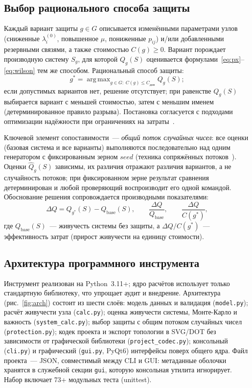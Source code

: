 \documentclass[12pt]{article}
\DeclareMathOperator*{\argmax}{arg\,max}
\begin{document}
\subsection{Выбор рационального способа защиты}

Каждый вариант защиты $g \in G$ описывается изменёнными параметрами узлов
(сниженные $\lambda_i^{(0)}$, повышенное $\mu$, пониженные $p_{ij}$)
и/или добавленными резервными связями, а также стоимостью $C(g) \geq 0$.
Вариант порождает производную систему $S_g$, для которой $Q_g(S)$
оценивается формулами~\eqref{eq:px}--\eqref{eq:wilson} тем же способом.
Рациональный способ защиты:
\begin{equation}
g^{*} = \argmax_{g \in G:\; C(g) \leq C_{\text{доп}}} Q_g(S);
\label{eq:argmax}
\end{equation}
если допустимых вариантов нет, решение отсутствует; при равенстве
$Q_g(S)$ выбирается вариант с меньшей стоимостью, затем с меньшим именем
(детерминированное правило разрыва). Постановка согласуется с подходами
оптимизации надёжности при ограничениях на
затраты~\cite{rausand,barlow}.

Ключевой элемент сопоставимости~--- \emph{общий поток случайных чисел}:
все оценки (базовая система и все варианты) выполняются последовательно
над одним генератором с фиксированным зерном $seed$ (техника сопряжённых
потоков~\cite{glasserman,ross}). Оценки $\hat Q_g(S)$ зависимы, их
различия отражают различия вариантов, а не случайность потоков; при
фиксированном зерне результат сравнения детерминирован и любой проверяющий
воспроизводит его одной командой. Обоснование решения сопровождается
производными показателями:
\begin{equation}
\Delta Q = Q_{g^{*}}(S) - Q_{\text{base}}(S), \qquad
\frac{\Delta Q}{Q_{\text{base}}}, \qquad
\frac{\Delta Q}{C(g^{*})},
\label{eq:deltaq}
\end{equation}
где $Q_{\text{base}}(S)$~--- живучесть системы без защиты, а
$\Delta Q / C(g^{*})$~--- эффективность затрат (прирост живучести на
единицу стоимости).

\subsection{Архитектура программного инструмента}

Инструмент реализован на Python~3.11+; ядро расчётов использует только
стандартную библиотеку, что упрощает аудит и внедрение. Архитектура
(рис.~\ref{fig:arch}) состоит из шести слоёв: модель данных и валидация
(\texttt{model.py}); расчёт живучести узла (\texttt{calc.py}); оценка
живучести системы, Монте-Карло и важность (\texttt{system\_calc.py});
выбор защиты с общим потоком случайных чисел (\texttt{protection.py});
кодек проекта и экспорт топологии в SVG/DOT без зависимости от
графической библиотеки (\texttt{project\_codec.py}); консольный
(\texttt{cli.py}) и графический (\texttt{gui.py}, PyQt6) интерфейсы поверх
общего ядра. Файл проекта~--- JSON, совместимый между CLI и GUI: метаданные
оболочки хранятся в служебной секции \texttt{gui}, которую консольная
утилита игнорирует. Набор включает 73+ модульных теста (unittest).
\end{document}
